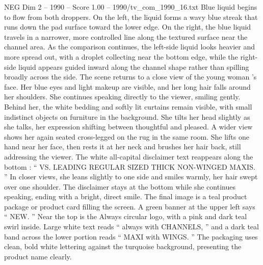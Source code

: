 \begin{textsample}{NEG Dim 2 – 1990 – Score 1.00 – 1990/tv\_com\_1990\_16.txt}
Blue liquid begins to flow from both droppers.
On the left, the liquid forms a wavy blue streak that runs down the pad surface toward the lower edge.
On the right, the blue liquid travels in a narrower, more controlled line along the textured surface near the channel area.
As the comparison continues, the left-side liquid looks heavier and more spread out, with a droplet collecting near the bottom edge, while the right-side liquid appears guided inward along the channel shape rather than spilling broadly across the side.
The scene returns to a close view of the young woman ’s face.
Her blue eyes and light makeup are visible, and her long hair falls around her shoulders.
She continues speaking directly to the viewer, smiling gently.
Behind her, the white bedding and softly lit curtains remain visible, with small indistinct objects on furniture in the background.
She tilts her head slightly as she talks, her expression shifting between thoughtful and pleased.
A wider view shows her again seated cross-legged on the rug in the same room.
She lifts one hand near her face, then rests it at her neck and brushes her hair back, still addressing the viewer.
The white all-capital disclaimer text reappears along the bottom : “ VS.
LEADING REGULAR SIZED THICK NON-WINGED MAXIS. ” In closer views, she leans slightly to one side and smiles warmly, her hair swept over one shoulder.
The disclaimer stays at the bottom while she continues speaking, ending with a bright, direct smile.
The final image is a teal product package or product card filling the screen.
A green banner at the upper left says “ NEW. ” Near the top is the Always circular logo, with a pink and dark teal swirl inside.
Large white text reads “ always with CHANNELS, ” and a dark teal band across the lower portion reads “ MAXI with WINGS. ” The packaging uses clean, bold white lettering against the turquoise background, presenting the product name clearly.

\end{textsample}

